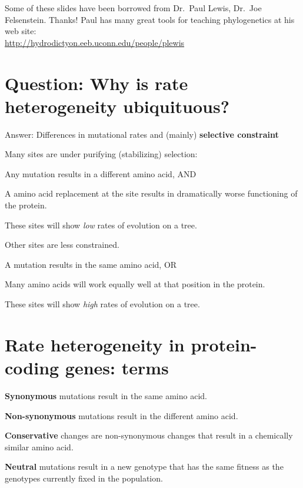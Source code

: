 \documentclass[landscape]{foils}
\begin{document}
\pagecolor{white}
\unitlength=1mm
\begin{center}
{\Large Some of these slides have been borrowed from Dr.\ Paul Lewis, Dr.\ Joe Felsenstein. Thanks!}
\vskip 15mm
\large Paul has many great tools for teaching phylogenetics at his web site: \\
\url{http://hydrodictyon.eeb.uconn.edu/people/plewis}
\end{center}

\myNewSlide
 

\myNewSlide
\section*{Question: Why is rate heterogeneity ubiquituous?}
Answer: Differences in mutational rates and (mainly) {\bf selective constraint}
\begin{compactitem}
	\item Many sites are under purifying (stabilizing) selection:
	\begin{compactitem}
		\item Any mutation results in a different amino acid, AND
		\item A amino acid replacement at the site results in dramatically worse functioning of the protein.
		\item These sites will show {\em low} rates of evolution on a tree.
	\end{compactitem}
	\item Other sites are less constrained.
	\begin{compactitem}
		\item A mutation results in the same amino acid, OR
		\item Many amino acids will work equally well at that position in the protein.
		\item These sites will show {\em high} rates of evolution on a tree.
	\end{compactitem}
\end{compactitem}

\myNewSlide
\section*{Rate heterogeneity in protein-coding genes: terms}
\large
\begin{compactitem}
	\item {\bf Synonymous} mutations result in the same amino acid.
	\item {\bf Non-synonymous} mutations result in the different amino acid.
	\item {\bf Conservative} changes are non-synonymous changes that result in a chemically similar amino acid.
	\item {\bf Neutral} mutations result in a new genotype that has the same fitness as the genotypes currently fixed in the population.
\end{compactitem}
\end{document}
